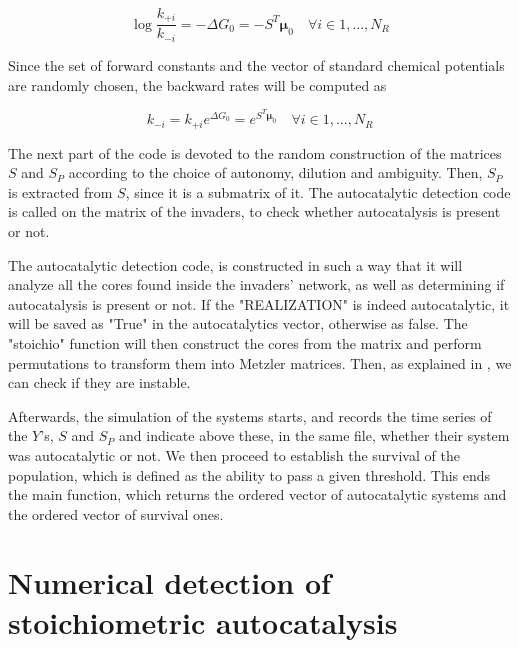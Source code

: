 \documentclass{article}
\begin{document}
\begin{center}
    \begin{equation}
        \log \frac{k_{+i}}{k_{-i}} = -\Delta G_0 = - S^T \pmb{\mu}_0 \quad \forall i \in 1, . . ., N_R
    \end{equation}
\end{center}

Since the set of forward constants and the vector of standard chemical potentials are randomly chosen, the backward rates will be computed as 

\begin{center}
    \begin{equation}
       k_{-i} = k_{+i} e^{\Delta G_0} = e^{S^T\pmb{\mu}_0} \quad \forall i \in 1, . . ., N_R
    \end{equation}
\end{center}




The next part of the code is devoted to the random construction of the matrices $S$ and $S_P$ according to the choice of autonomy, dilution and ambiguity. Then, $S_P$ is extracted from $S$, since it is a submatrix of it. The autocatalytic detection code is called on the matrix of the invaders, to check whether autocatalysis is present or not.

The autocatalytic detection code, is constructed in such a way that it will analyze all the cores found inside the invaders' network, as well as determining if autocatalysis is present or not. If the "REALIZATION" is indeed autocatalytic, it will be saved as "True" in the autocatalytics vector, otherwise as false. The "stoichio" function will then construct the cores from the matrix and perform permutations to transform them into Metzler matrices. Then, as explained in \cite{1}, we can check if they are instable.


Afterwards, the simulation of the systems starts, and records the time series of the $Y$'s, $S$ and $S_P$ and indicate above these, in the same file, whether their system was autocatalytic or not. We then proceed to establish the survival of the population, which is defined as the ability to pass a given threshold. This ends the main function, which returns the ordered vector of autocatalytic systems and the ordered vector of survival ones.

\section{Numerical detection of stoichiometric autocatalysis}
\end{document}
